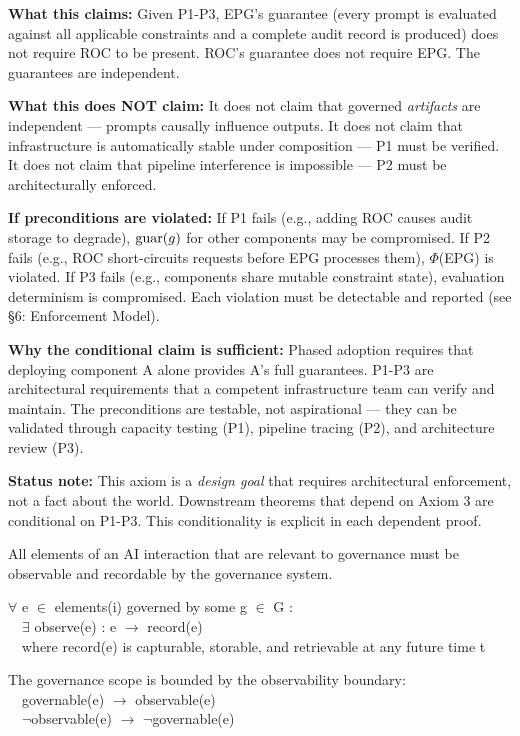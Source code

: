 \textbf{What this claims:} Given P1-P3, EPG's guarantee (every prompt is evaluated against all applicable constraints and a complete audit record is produced) does not require ROC to be present. ROC's guarantee does not require EPG. The guarantees are independent.

\textbf{What this does NOT claim:} It does not claim that governed \emph{artifacts} are independent --- prompts causally influence outputs. It does not claim that infrastructure is automatically stable under composition --- P1 must be verified. It does not claim that pipeline interference is impossible --- P2 must be architecturally enforced.

\textbf{If preconditions are violated:} If P1 fails (e.g., adding ROC causes audit storage to degrade), $\operatorname{guar}(g)$ for other components may be compromised. If P2 fails (e.g., ROC short-circuits requests before EPG processes them), $\Phi$(EPG) is violated. If P3 fails (e.g., components share mutable constraint state), evaluation determinism is compromised. Each violation must be detectable and reported (see \S{}6: Enforcement Model).

\textbf{Why the conditional claim is sufficient:} Phased adoption requires that deploying component A alone provides A's full guarantees. P1-P3 are architectural requirements that a competent infrastructure team can verify and maintain. The preconditions are testable, not aspirational --- they can be validated through capacity testing (P1), pipeline tracing (P2), and architecture review (P3).

\textbf{Status note:} This axiom is a \emph{design goal} that requires architectural enforcement, not a fact about the world. Downstream theorems that depend on Axiom 3 are conditional on P1-P3. This conditionality is explicit in each dependent proof.

\begin{caxiom}[4 (Observability)]

All elements of an AI interaction that are relevant to governance must be observable and recordable by the governance system.

\begin{claddisp}
$\forall$ e $\in$ elements(i) governed by some g $\in$ G :\\
~~$\exists$ observe(e) : e $\to$ record(e)\\
~~where record(e) is capturable, storable, and retrievable at any future time t
\par\smallskip
The governance scope is bounded by the observability boundary:\\
~~governable(e) $\to$ observable(e)\\
~~$\neg$observable(e) $\to$ $\neg$governable(e)
\end{claddisp}


\end{caxiom}

